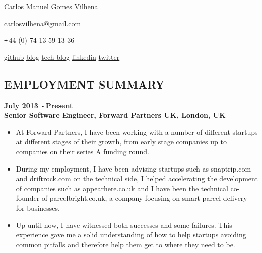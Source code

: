 \documentclass{res}
\def\Plus{\texttt{+}\,}
\def\Minus{\texttt{-}\,}
\begin{document}
\thispagestyle{empty}
\centerline{Carlos Manuel Gomes Vilhena}
\vspace{0.1in}
\centerline{\href{mailto:carlosvilhena@gmail.com}{carlosvilhena@gmail.com}}
\centerline{\Plus 44 (0) 74 13 59 13 36}
\centerline{\href{http://github.com/carvil}{github} \hspace{0.5 cm}
\href{http://www.carlosvilhena.com}{blog}  \hspace{0.5 cm}
\href{http://carvil.github.com/}{tech blog}  \hspace{0.5 cm}
\href{http://www.linkedin.com/in/carlosvilhena}{linkedin}  \hspace{0.5 cm}
\href{http://www.twitter.com/carvil_}{twitter}
}


\begin{resume}
\vspace{0.1in}


\section{EMPLOYMENT SUMMARY}
\vspace{0.1in}
  {\bf July 2013 \Minus Present}\\
  {\bf Senior Software Engineer, Forward Partners UK, London, UK}
    \begin{itemize} %
      \item[] At Forward Partners, I have been working with a number of different
        startups at different stages of their growth, from early stage companies
        up to companies on their series A funding round.
      \item[] During my employment, I have been advising startups such as
        snaptrip.com and driftrock.com on the technical side, I helped
        accelerating the development of companies such as appearhere.co.uk
        and I have been the technical co-founder of parcelbright.co.uk, a
        company focusing on smart parcel delivery for businesses.
      \item[] Up until now, I have witnessed both successes and some failures.
        This experience gave me a solid understanding of how to help startups
        avoiding common pitfalls and therefore help them get to where they
        need to be.
    \end{itemize}


\end{resume}
\end{document}

